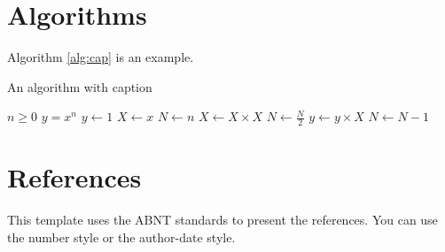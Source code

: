 
    
    

                
                
    

\section{Algorithms}

Algorithm \ref{alg:cap} is an example.

\begin{algorithm}
\caption{An algorithm with caption}\label{alg:cap}
\begin{algorithmic}
\Require $n \geq 0$
\Ensure $y = x^n$
\State $y \gets 1$
\State $X \gets x$
\State $N \gets n$
    \State $X \gets X \times X$
    \State $N \gets \frac{N}{2}$  
    \State $y \gets y \times X$
    \State $N \gets N - 1$
\EndIf
\EndWhile
\end{algorithmic}
\end{algorithm}


\section{References}

This template uses the ABNT standards to present the references. You can use the number style or the author-date style.